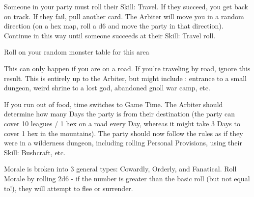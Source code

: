 {\begin{multicols}{2}
  Someone in your party must roll their Skill: Travel.  If they succeed, you get back on track.  If they fail, pull another card. The Arbiter will move you in a random direction (on a hex map, roll a d6 and move the party in that direction). Continue in this way until someone succeeds at their Skill: Travel roll.  



  Roll on your random monster table for this area


  This can only happen if you are  on a road. If you're traveling by road, ignore this result.  This is entirely up to the Arbiter, but might include : entrance to a small dungeon, weird shrine to a lost god, abandoned gnoll war camp, etc.


  If you run out of food, time switches to Game Time.  The Arbiter should determine how many Days the party is from their destination (the party can cover 10 leagues / 1 hex on a road every Day, whereas it might take 3 Days to cover 1 hex in the mountains).  The party should now follow the rules as if they were in a wilderness dungeon, including rolling Personal Provisions, using their Skill: Bushcraft, etc. 


  \newpage




Morale is broken into 3 general types:  Cowardly, Orderly, and Fanatical.  Roll Morale by rolling 2d6 - if the number is greater than the basic roll (but not equal to!), they will attempt to flee or surrender.

\end{multicols}}
